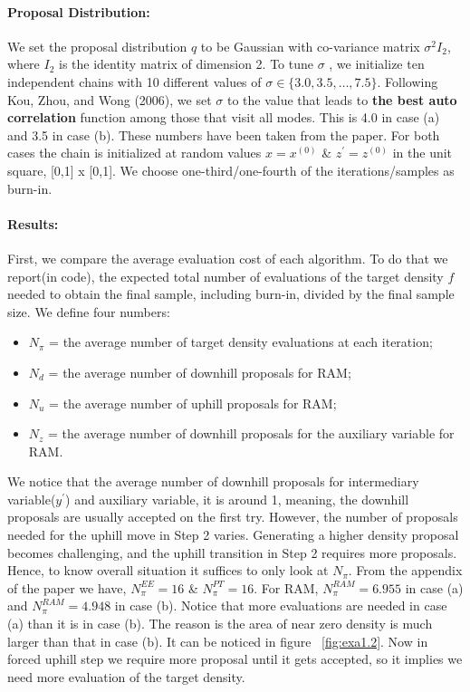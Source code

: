 \documentclass{article}
\begin{document}
\paragraph{Proposal Distribution:}We set the proposal distribution $q$ to be Gaussian with co-variance matrix $\sigma^2 I_2$, where $I_2$ is the identity matrix of dimension 2. To tune $\sigma$ , we initialize ten independent chains with 10 different values of $\sigma \in \{3.0, 3.5, \ldots, 7.5\}.$ %
Following Kou, Zhou, and Wong (2006), we set $\sigma$ to the
value that leads to \textbf{the best auto correlation} function among
those that visit all modes. This is 4.0 in case (a) and 3.5 in
case (b). These numbers have been taken from the paper. For both cases the chain is initialized at random values $x=x^{(0)}$ \& $z^{'}=z^{(0)}$ in the unit square, [0,1] x [0,1]. We choose one-third/one-fourth of the iterations/samples as burn-in.
\paragraph{Results:}First, we compare the average evaluation cost of each algorithm. To do that we report(in code), the expected total number of evaluations of
the target density $f$ needed to obtain the final sample, including burn-in, divided by the final sample size. We define four numbers:
\begin{itemize}
    \item $N_\pi$ = the average number of target density
evaluations at each iteration; 
\item $N_d$ = the average number of downhill proposals for RAM; \item $N_u$ = the average number of uphill proposals for RAM; \item $N_z$ = the average number
of downhill proposals for the auxiliary variable for RAM.
\end{itemize}
We notice that the average number of downhill proposals for intermediary variable($y^{'}$) and auxiliary variable, it is around 1, meaning, the
downhill proposals are usually accepted on the
first try. However, the number of proposals needed for the uphill
move in Step 2 varies. Generating a higher density proposal becomes challenging, and
the uphill transition in Step 2 requires more proposals. Hence, to know overall situation it suffices to only look at $N_\pi$. From the appendix of the paper we have, $N_\pi^{EE}=16$ \& $N_\pi^{PT}=16$. For RAM, $N_\pi^{RAM}=6.955$ in case (a) and $N_\pi^{RAM}=4.948$ in case (b). Notice that more evaluations are needed in case (a) than it is in case (b). The reason is the area of near zero density is
much larger than that in case (b). It can be noticed in figure ~\ref{fig:exa1.2}. Now in forced uphill step we require more proposal until it gets accepted, so it implies we need more evaluation of the target density.
\end{document}
